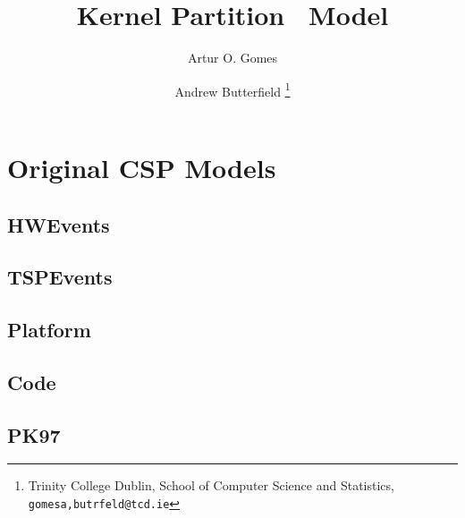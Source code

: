 \documentclass{report}
\begin{document}
\title{Kernel Partition \Circus\ Model}

\author{%
  Artur O. Gomes
  \and
  Andrew Butterfield
\thanks{%
  Trinity College Dublin,
  School of Computer Science and Statistics,
  \texttt{gomesa,butrfeld@tcd.ie}
}
}

\maketitle

\tableofcontents




\appendix

%
% 

\chapter{Original CSP Models}

\section{HWEvents}


\newpage
\section{TSPEvents}


\newpage
\section{Platform}


\newpage
\section{Code}


\newpage
\section{PK97}

\end{document}
